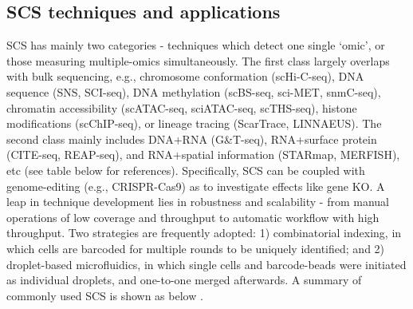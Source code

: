 \subsection{SCS techniques and applications}

SCS has mainly two categories - techniques which detect one single `omic', or those measuring multiple-omics simultaneously. The first class largely overlaps with bulk sequencing, e.g., chromosome conformation (scHi-C-seq), DNA sequence (SNS, SCI-seq), DNA methylation (scBS-seq, sci-MET, snmC-seq), chromatin accessibility (scATAC-seq, sciATAC-seq, scTHS-seq), histone modifications (scChIP-seq), or lineage tracing (ScarTrace, LINNAEUS). The second class mainly includes DNA+RNA (G\&T-seq), RNA+surface protein (CITE-seq, REAP-seq), and RNA+spatial information (STARmap, MERFISH), etc (see table below for references). Specifically, SCS can be coupled with genome-editing (e.g., CRISPR-Cas9) as to investigate effects like gene KO. A leap in technique development lies in robustness and scalability - from manual operations of low coverage and throughput to automatic workflow with high throughput. Two strategies are frequently adopted: 1) combinatorial indexing, in which cells are barcoded for multiple rounds to be uniquely identified; and 2) droplet-based microfluidics, in which single cells and barcode-beads were initiated as individual droplets, and one-to-one merged afterwards. A summary of commonly used SCS is shown as below \citep{stuart2019comprehensive}.


